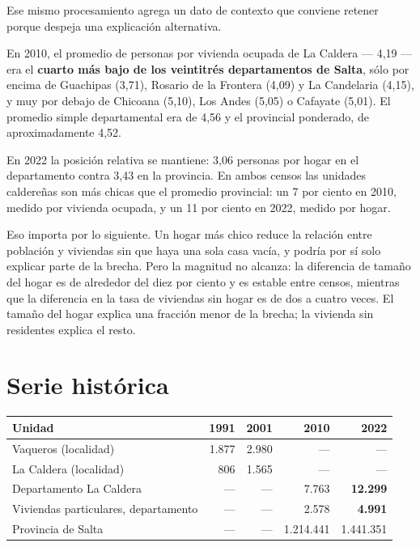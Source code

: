Ese mismo procesamiento agrega un dato de contexto que conviene retener porque despeja una explicación alternativa.

En 2010, el promedio de personas por vivienda ocupada de La Caldera --- 4,19 --- era el \textbf{cuarto más bajo de los veintitrés departamentos de Salta}, sólo por encima de Guachipas (3,71), Rosario de la Frontera (4,09) y La Candelaria (4,15), y muy por debajo de Chicoana (5,10), Los Andes (5,05) o Cafayate (5,01). El promedio simple departamental era de 4,56 y el provincial ponderado, de aproximadamente 4,52.

En 2022 la posición relativa se mantiene: 3,06 personas por hogar en el departamento contra 3,43 en la provincia. En ambos censos las unidades caldereñas son más chicas que el promedio provincial: un 7 por ciento en 2010, medido por vivienda ocupada, y un 11 por ciento en 2022, medido por hogar.

Eso importa por lo siguiente. Un hogar más chico reduce la relación entre población y viviendas sin que haya una sola casa vacía, y podría por sí solo explicar parte de la brecha. Pero la magnitud no alcanza: la diferencia de tamaño del hogar es de alrededor del diez por ciento y es estable entre censos, mientras que la diferencia en la tasa de viviendas sin hogar es de dos a cuatro veces. El tamaño del hogar explica una fracción menor de la brecha; la vivienda sin residentes explica el resto.



\section{Serie histórica}

\begin{longtable}{@{}p{3.2cm}rrrr@{}}
\toprule
\textbf{Unidad} & \textbf{1991} & \textbf{2001} & \textbf{2010} & \textbf{2022} \\
\midrule
\endhead
Vaqueros (localidad) & 1.877 & 2.980 & --- & --- \\
La Caldera (localidad) & 806 & 1.565 & --- & --- \\
\addlinespace
Departamento La Caldera & --- & --- & 7.763 & \textbf{12.299} \\
Viviendas particulares, departamento & --- & --- & 2.578 & \textbf{4.991} \\
\addlinespace
Provincia de Salta & --- & --- & 1.214.441 & 1.441.351 \\
\bottomrule
\end{longtable}

